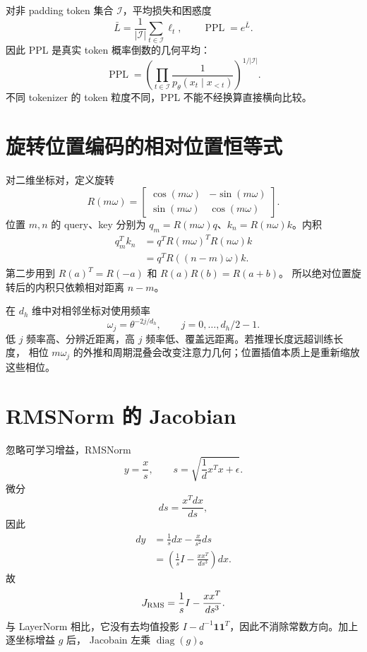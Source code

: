 \documentclass[11pt]{article}
\numberwithin{equation}{section}
\newcommand{\1}{\mathbf{1}}
\newcommand{\diag}{\operatorname{diag}}
\begin{document}
对非 padding token 集合 $\mathcal I$，平均损失和困惑度
\begin{equation}
 \bar L=\frac1{|\mathcal I|}\sum_{t\in\mathcal I}\ell_t,
 \qquad \operatorname{PPL}=e^{\bar L}.
\end{equation}
因此 PPL 是真实 token 概率倒数的几何平均：
\begin{equation}
 \operatorname{PPL}=\left(
 \prod_{t\in\mathcal I}\frac1{p_\theta(x_t\mid x_{<t})}
 \right)^{1/|\mathcal I|}.
\end{equation}
不同 tokenizer 的 token 粒度不同，PPL 不能不经换算直接横向比较。

\section{旋转位置编码的相对位置恒等式}

对二维坐标对，定义旋转
\begin{equation}
 R(m\omega)=
 \begin{bmatrix}
 \cos(m\omega)&-\sin(m\omega)\\
 \sin(m\omega)&\cos(m\omega)
 \end{bmatrix}.
\end{equation}
位置 $m,n$ 的 query、key 分别为
$q_m=R(m\omega)q$、$k_n=R(n\omega)k$。内积
\begin{align}
 q_m^Tk_n
 &=q^TR(m\omega)^TR(n\omega)k\\
 &=q^TR((n-m)\omega)k.
\end{align}
第二步用到 $R(a)^T=R(-a)$ 和 $R(a)R(b)=R(a+b)$。
所以绝对位置旋转后的内积只依赖相对距离 $n-m$。

在 $d_h$ 维中对相邻坐标对使用频率
\begin{equation}
 \omega_j=\theta^{-2j/d_h},\qquad j=0,\ldots,d_h/2-1.
\end{equation}
低 $j$ 频率高、分辨近距离，高 $j$ 频率低、覆盖远距离。若推理长度远超训练长度，
相位 $m\omega_j$ 的外推和周期混叠会改变注意力几何；位置插值本质上是重新缩放这些相位。

\section{RMSNorm 的 Jacobian}

忽略可学习增益，RMSNorm
\begin{equation}
 y=\frac{x}{s},\qquad
 s=\sqrt{\frac1d x^Tx+\epsilon}.
\end{equation}
微分
\begin{equation}
 ds=\frac{x^Tdx}{d s},
\end{equation}
因此
\begin{align}
 dy&=\frac1s dx-\frac{x}{s^2}ds\\
 &=\left(\frac1sI-\frac{xx^T}{d s^3}\right)dx.
\end{align}
故
\begin{equation}
 J_{\rm RMS}=\frac1sI-\frac{xx^T}{d s^3}.
\end{equation}
与 LayerNorm 相比，它没有去均值投影
$I-d^{-1}\1\1^T$，因此不消除常数方向。加上逐坐标增益 $g$ 后，
Jacobain 左乘 $\diag(g)$。
\end{document}
